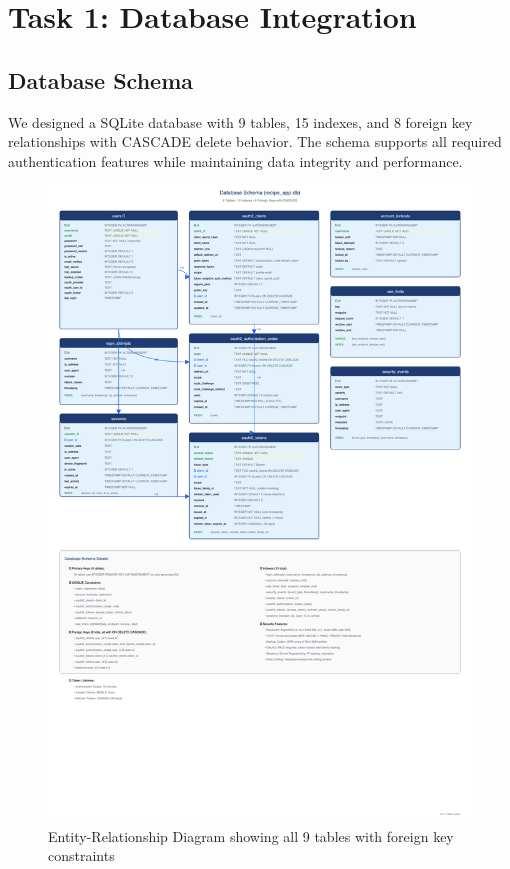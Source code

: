 \documentclass[12pt,a4paper]{article}
\begin{document}
\section{Task 1: Database Integration}

\subsection{Database Schema}

We designed a SQLite database with 9 tables, 15 indexes, and 8 foreign key relationships with CASCADE delete behavior. The schema supports all required authentication features while maintaining data integrity and performance.

\begin{figure}[H]
    \centering
    \includegraphics[width=\textwidth,height=0.9\textheight,keepaspectratio]{diagrams/4_database_er.png}
    \caption{Entity-Relationship Diagram showing all 9 tables with foreign key constraints}
    \label{fig:database}
\end{figure}
\end{document}
